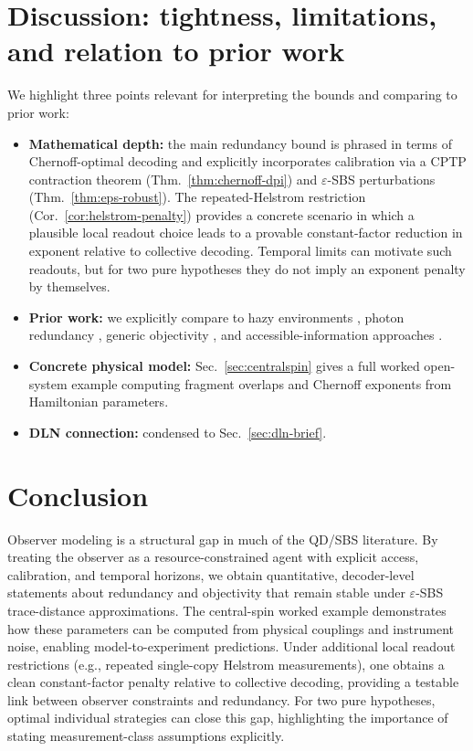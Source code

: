 \documentclass[11pt]{article}
\newcommand{\1}{\mathbf{1}}
\theoremstyle{definition}
\theoremstyle{plain}
\begin{document}
\section{Discussion: tightness, limitations, and relation to prior work}

We highlight three points relevant for interpreting the bounds and comparing to prior work:

\begin{itemize}[leftmargin=2em]
\item \textbf{Mathematical depth:} the main redundancy bound is phrased in terms of Chernoff-optimal decoding \citep{Audenaert2007,NussbaumSzkola2009} and explicitly incorporates calibration via a CPTP contraction theorem (Thm.~\ref{thm:chernoff-dpi}) and $\varepsilon$-SBS perturbations (Thm.~\ref{thm:eps-robust}).
The repeated-Helstrom restriction (Cor.~\ref{cor:helstrom-penalty}) provides a concrete scenario in which a plausible local readout choice leads to a provable constant-factor reduction in exponent relative to collective decoding. Temporal limits can motivate such readouts, but for two pure hypotheses they do not imply an exponent penalty by themselves.
\item \textbf{Prior work:} we explicitly compare to hazy environments \citep{ZwolakQuanZurek2009}, photon redundancy \citep{RiedelZurek2010,RiedelZurek2011}, generic objectivity \citep{BrandaoPianiHorodecki2015,Knott2018}, and accessible-information approaches \citep{Touil2022}.
\item \textbf{Concrete physical model:} Sec.~\ref{sec:centralspin} gives a full worked open-system example computing fragment overlaps and Chernoff exponents from Hamiltonian parameters.
\item \textbf{DLN connection:} condensed to Sec.~\ref{sec:dln-brief}.
\end{itemize}

\section{Conclusion}

Observer modeling is a structural gap in much of the QD/SBS literature.
By treating the observer as a resource-constrained agent with explicit access, calibration, and temporal horizons, we obtain quantitative, decoder-level statements about redundancy and objectivity that remain stable under $\varepsilon$-SBS trace-distance approximations.
The central-spin worked example demonstrates how these parameters can be computed from physical couplings and instrument noise, enabling model-to-experiment predictions.
Under additional local readout restrictions (e.g., repeated single-copy Helstrom measurements), one obtains a clean constant-factor penalty relative to collective decoding, providing a testable link between observer constraints and redundancy. For two pure hypotheses, optimal individual strategies can close this gap, highlighting the importance of stating measurement-class assumptions explicitly.



\end{document}
